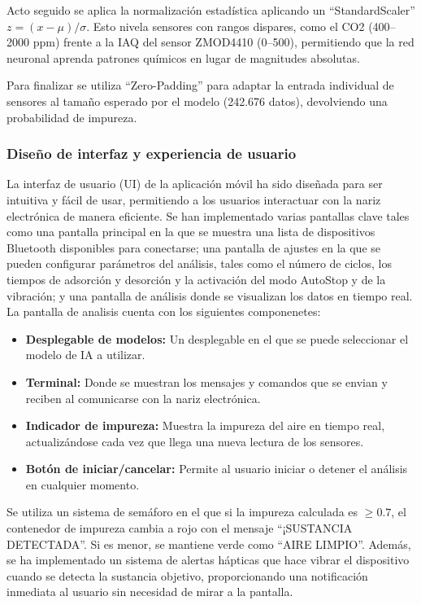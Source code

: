 Acto seguido se aplica la normalización estadística aplicando un ``StandardScaler'' $z = (x - \mu) / \sigma$. Esto nivela sensores con rangos dispares, como el CO2 (400--2000 ppm) frente a la IAQ del sensor ZMOD4410 (0--500), permitiendo que la red neuronal aprenda patrones químicos en lugar de magnitudes absolutas.
\par

Para finalizar se utiliza ``Zero-Padding'' para adaptar la entrada individual de sensores al tamaño esperado por el modelo (242.676 datos), devolviendo una probabilidad de impureza.

\subsubsection{Diseño de interfaz y experiencia de usuario}
La interfaz de usuario (UI) de la aplicación móvil ha sido diseñada para ser intuitiva y fácil de usar, permitiendo a los usuarios interactuar con la nariz electrónica de manera eficiente. Se han implementado varias pantallas clave tales como una pantalla principal en la que se muestra una lista de dispositivos Bluetooth disponibles para conectarse; una pantalla de ajustes en la que se pueden configurar parámetros del análisis, tales como el número de ciclos, los tiempos de adsorción y desorción y la activación del modo AutoStop y de la vibración; y una pantalla de análisis donde se visualizan los datos en tiempo real. La pantalla de analisis cuenta con los siguientes componenetes:

\begin{itemize}
    \item \textbf{Desplegable de modelos:} Un desplegable en el que se puede seleccionar el modelo de IA a utilizar.
    \item \textbf{Terminal:} Donde se muestran los mensajes y comandos que se envian y reciben al comunicarse con la nariz electrónica.
    \item \textbf{Indicador de impureza:} Muestra la impureza del aire en tiempo real, actualizándose cada vez que llega una nueva lectura de los sensores.
    \item \textbf{Botón de iniciar/cancelar:} Permite al usuario iniciar o detener el análisis en cualquier momento.
\end{itemize}

Se utiliza un sistema de semáforo en el que si la impureza calculada es $\ge 0.7$, el contenedor de impureza cambia a rojo con el mensaje ``¡SUSTANCIA DETECTADA\!''. Si es menor, se mantiene verde como ``AIRE LIMPIO''. Además, se ha implementado un sistema de alertas hápticas que hace vibrar el dispositivo cuando se detecta la sustancia objetivo, proporcionando una notificación inmediata al usuario sin necesidad de mirar a la pantalla.
\par

